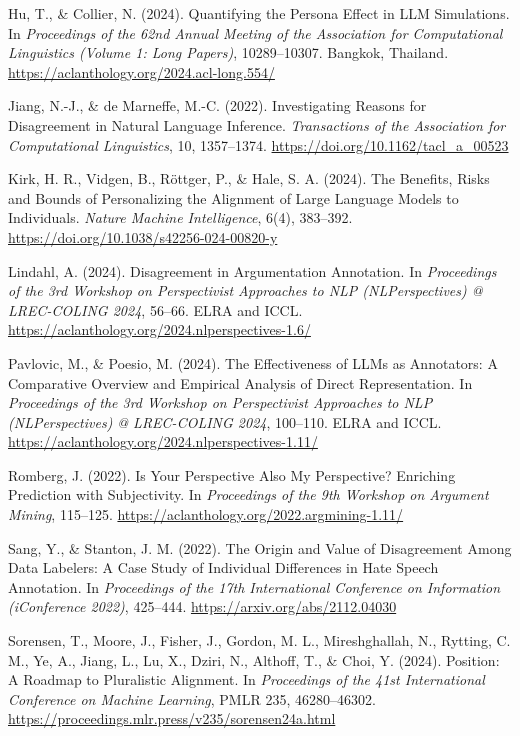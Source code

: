 \begin{description}[leftmargin=1.6em,style=unboxed,itemsep=0.3em]
\item Hu, T., \& Collier, N. (2024). Quantifying the Persona Effect in LLM Simulations. In
\emph{Proceedings of the 62nd Annual Meeting of the Association for Computational Linguistics
(Volume 1: Long Papers)}, 10289--10307. Bangkok, Thailand.
\url{https://aclanthology.org/2024.acl-long.554/}

\item Jiang, N.-J., \& de Marneffe, M.-C. (2022). Investigating Reasons for Disagreement in
Natural Language Inference. \emph{Transactions of the Association for Computational Linguistics},
10, 1357--1374. \url{https://doi.org/10.1162/tacl_a_00523}

\item Kirk, H. R., Vidgen, B., R\"{o}ttger, P., \& Hale, S. A. (2024). The Benefits, Risks and
Bounds of Personalizing the Alignment of Large Language Models to Individuals. \emph{Nature
Machine Intelligence}, 6(4), 383--392. \url{https://doi.org/10.1038/s42256-024-00820-y}

\item Lindahl, A. (2024). Disagreement in Argumentation Annotation. In \emph{Proceedings of the
3rd Workshop on Perspectivist Approaches to NLP (NLPerspectives) @ LREC-COLING 2024}, 56--66.
ELRA and ICCL. \url{https://aclanthology.org/2024.nlperspectives-1.6/}

\item Pavlovic, M., \& Poesio, M. (2024). The Effectiveness of LLMs as Annotators: A Comparative
Overview and Empirical Analysis of Direct Representation. In \emph{Proceedings of the 3rd Workshop
on Perspectivist Approaches to NLP (NLPerspectives) @ LREC-COLING 2024}, 100--110. ELRA and ICCL.
\url{https://aclanthology.org/2024.nlperspectives-1.11/}

\item Romberg, J. (2022). Is Your Perspective Also My Perspective? Enriching Prediction with
Subjectivity. In \emph{Proceedings of the 9th Workshop on Argument Mining}, 115--125.
\url{https://aclanthology.org/2022.argmining-1.11/}

\item Sang, Y., \& Stanton, J. M. (2022). The Origin and Value of Disagreement Among Data
Labelers: A Case Study of Individual Differences in Hate Speech Annotation. In
\emph{Proceedings of the 17th International Conference on Information (iConference 2022)},
425--444. \url{https://arxiv.org/abs/2112.04030}

\item Sorensen, T., Moore, J., Fisher, J., Gordon, M. L., Mireshghallah, N., Rytting, C. M., Ye,
A., Jiang, L., Lu, X., Dziri, N., Althoff, T., \& Choi, Y. (2024). Position: A Roadmap to
Pluralistic Alignment. In \emph{Proceedings of the 41st International Conference on Machine
Learning}, PMLR 235, 46280--46302.
\url{https://proceedings.mlr.press/v235/sorensen24a.html}


\end{description}
